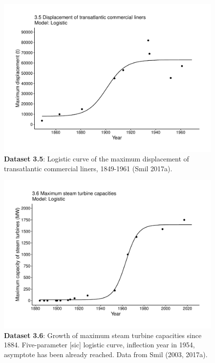 \documentclass[aps,rmp,preprint,superscriptaddress,10pt,onecolumn]{article}
\begin{document}
\clearpage
\begin{figure}[h]
\includegraphics[width=\textwidth]{output/figs-ggplot/3.5.pdf}
\caption{\textbf{Dataset 3.5}: Logistic curve of the maximum displacement of transatlantic commercial liners, 1849-1961 (Smil 2017a).}
\end{figure}
	
\clearpage
\begin{figure}[h]
\includegraphics[width=\textwidth]{output/figs-ggplot/3.6.pdf}
\caption{\textbf{Dataset 3.6}: Growth of maximum steam turbine capacities since 1884. Five-parameter [sic] logistic curve, inflection year in 1954, asymptote has been already reached. Data from Smil (2003, 2017a).}
\end{figure}
	
\end{document}
